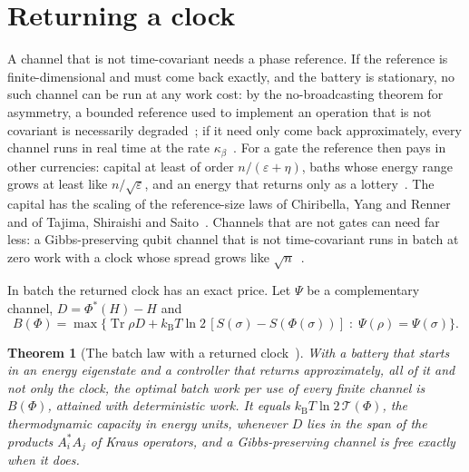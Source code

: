 \documentclass[11pt]{article}
\newtheorem{theorem}{Theorem}
\theoremstyle{definition}
\theoremstyle{remark}
\newcommand{\Tr}{\operatorname{Tr}}
\newcommand{\kB}{k_{\mathrm B}}
\newcommand{\Trt}{\kappa_\beta}
\begin{document}
\section{Returning a clock}\label{sec:clock}

A channel that is not time-covariant needs a phase reference. If the reference is finite-dimensional and must come back exactly, and the battery is stationary, no such channel can be run at any work cost: by the no-broadcasting theorem for asymmetry, a bounded reference used to implement an operation that is not covariant is necessarily degraded~\cite{MarvianSpekkens19,LostaglioMuller19}; if it need only come back approximately, every channel runs in real time at the rate $\Trt$~\cite{SaveWork}. For a gate the reference then pays in other currencies: capital at least of order $n/(\varepsilon+\eta)$, baths whose energy range grows at least like $n/\sqrt\varepsilon$, and an energy that returns only as a lottery~\cite{KeepingTime}. The capital has the scaling of the reference-size laws of Chiribella, Yang and Renner and of Tajima, Shiraishi and Saito~\cite{ChiribellaYangRenner21,TSS20}. Channels that are not gates can need far less: a Gibbs-preserving qubit channel that is not time-covariant runs in batch at zero work with a clock whose spread grows like $\sqrt n$~\cite{KeepingTime}.

In batch the returned clock has an exact price. Let $\Psi$ be a complementary channel, $D=\Phi^*(H)-H$ and
\[
B(\Phi)=\max\bigl\{\Tr\rho D+\kB T\ln2\,[S(\sigma)-S(\Phi(\sigma))]\;:\;\Psi(\rho)=\Psi(\sigma)\bigr\}.
\]

\begin{theorem}[The batch law with a returned clock~\cite{KeepingTime}]\label{thm:batchlaw}
With a battery that starts in an energy eigenstate and a controller that returns approximately, all of it and not only the clock, the optimal batch work per use of every finite channel is $B(\Phi)$, attained with deterministic work. It equals $\kB T\ln2\,\mathcal T(\Phi)$, the thermodynamic capacity in energy units, whenever $D$ lies in the span of the products $A_i^*A_j$ of Kraus operators, and a Gibbs-preserving channel is free exactly when it does.
\end{theorem}
\end{document}
